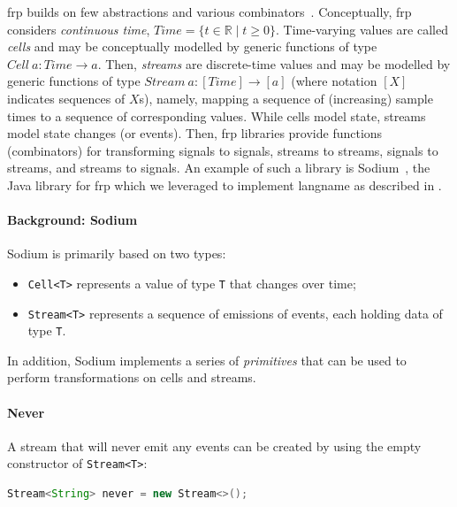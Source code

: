 \newcommand{\T}{\ensuremath{\mathit{Time}}}
\newcommand{\Sg}{\ensuremath{\mathit{Cell}}}
\newcommand{\St}{\ensuremath{\mathit{Stream}}}

\Ac{frp} builds on few abstractions and various combinators~\cite{DBLP:conf/pldi/WanH00}.
%
Conceptually,
\ac{frp} considers \emph{continuous time}, $\T = \{ t \in \mathbb{R} \mid t \geq 0 \}$.
%
Time-varying values are called \emph{cells}
 and may be conceptually modelled by generic functions of type $\Sg\:a: \T \to a$.
%
Then, \emph{streams} are discrete-time values
 and may be modelled by generic functions of type
$\St\:a: [\T] \to [a]$ (where notation $[X]$ indicates sequences of $X$s), namely, 
mapping a sequence of (increasing) sample times to a sequence of corresponding values.
%
While cells model state,
 streams model state changes (or events).
%
Then, \ac{frp} libraries %
 provide functions (combinators) for transforming signals to signals,
  streams to streams,
  signals to streams,
  and streams to signals.
%
An example of such a library %
 is Sodium~\cite{blackheath2016frp-sodium},
 the Java library for \ac{frp}
 which we leveraged to implement \ac{langname} as described in .
  

 

\paragraph*{Background: Sodium}
Sodium is primarily based on two types:
%
\begin{itemize}
  \item \texttt{Cell<T>} represents a value of type \texttt{T} that changes over time;
  \item \texttt{Stream<T>} represents a sequence of emissions of events, each holding data of type \texttt{T}.
\end{itemize}
%
In addition, Sodium implements a series of \textit{primitives} that can be used to perform transformations on cells and streams. 

\paragraph{Never}
A stream that will never emit any events can be created by using the empty constructor of \texttt{Stream<T>}:
%
\begin{lstlisting}[frame=single, language=java]
Stream<String> never = new Stream<>();
\end{lstlisting}

